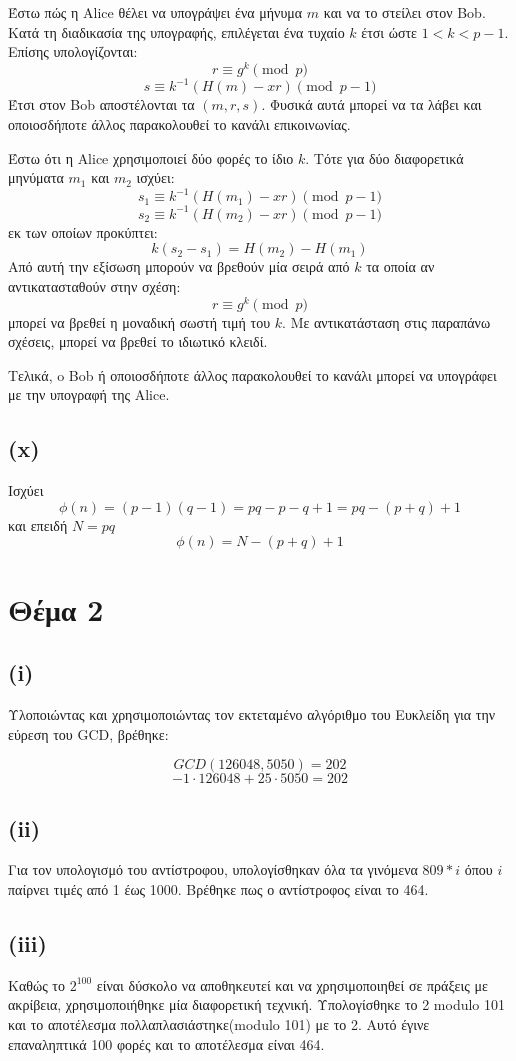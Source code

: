 \documentclass[a4paper, 11pt]{article}
\newcommand{\lt}{\latintext}
\begin{document}
Έστω πώς η {\lt Alice} θέλει να υπογράψει ένα μήνυμα $m$ και να το στείλει στον {\lt Bob}. Κατά τη διαδικασία της υπογραφής, επιλέγεται ένα τυχαίο $k$ έτσι ώστε $ 1 < k < p-1 $. Επίσης υπολογίζονται:
\[ r \equiv g^k \pmod{p} \]
\[ s \equiv k^{-1}(H(m)-xr) \pmod{p-1}\]
Έτσι στον {\lt Bob} αποστέλονται τα $(m,r,s)$. Φυσικά αυτά μπορεί να τα λάβει και οποιοσδήποτε άλλος παρακολουθεί το κανάλι επικοινωνίας.

Έστω ότι η {\lt Alice} χρησιμοποιεί δύο φορές το ίδιο $k$. Τότε για δύο διαφορετικά μηνύματα $m_1$ και $m_2$ ισχύει:
\[ s_1 \equiv k^{-1}(H(m_1)-xr) \pmod{ p-1}\]
\[ s_2 \equiv k^{-1}(H(m_2)-xr) \pmod{ p-1}\]
εκ των οποίων προκύπτει:
\[k(s_2 - s_1) = H(m_2) - H(m_1)\]
Από αυτή την εξίσωση μπορούν να βρεθούν μία σειρά από $k$ τα οποία αν αντικατασταθούν στην σχέση:
\[ r \equiv g^k \pmod{ p} \]
μπορεί να βρεθεί η μοναδική σωστή τιμή του $k$. Με αντικατάσταση στις παραπάνω σχέσεις, μπορεί να βρεθεί το ιδιωτικό κλειδί.

Τελικά, o {\lt Bob} ή οποιοσδήποτε άλλος παρακολουθεί το κανάλι μπορεί να υπογράφει με την υπογραφή της {\lt Alice}.

\subsection*{({\lt x})}
Ισχύει
\[\phi(n) = (p-1)(q-1) = pq - p - q + 1 = pq - (p+q) + 1\]
και επειδή $N = pq$
\[\phi(n) = N - (p+q) + 1\]
\newpage


\section*{Θέμα 2}
\subsection*{({\lt i})}
Υλοποιώντας και χρησιμοποιώντας τον εκτεταμένο αλγόριθμο του Ευκλείδη για την εύρεση του {\lt GCD}, βρέθηκε:

\[GCD(126048, 5050) = 202\]
\[-1 \cdot 126048 + 25 \cdot 5050 = 202\]

\subsection*{({\lt ii})}
Για τον υπολογισμό του αντίστροφου, υπολογίσθηκαν όλα τα γινόμενα $ 809 * i $ όπου $i$ παίρνει τιμές από 1 έως 1000. Βρέθηκε πως ο αντίστροφος είναι το 464.

\subsection*{({\lt iii})}
Καθώς το $2^{100}$ είναι δύσκολο να αποθηκευτεί και να χρησιμοποιηθεί σε πράξεις με ακρίβεια, χρησιμοποιήθηκε μία διαφορετική τεχνική. Υπολογίσθηκε το 2 {\lt modulo} 101 και το αποτέλεσμα πολλαπλασιάστηκε({\lt modulo} 101) με το 2. Αυτό έγινε επαναληπτικά 100 φορές και το αποτέλεσμα είναι 464.
\end{document}
